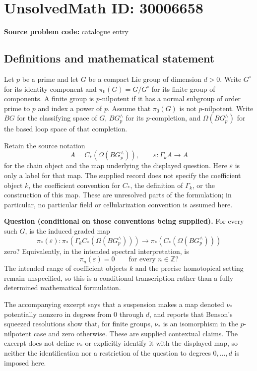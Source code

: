 \documentclass[11pt]{article}
\newcommand{\Z}{\mathbb{Z}}
\begin{document}
\section*{UnsolvedMath ID: 30006658}
\textbf{Source problem code:} catalogue entry
\subsection{Definitions and mathematical statement}
Let \(p\) be a prime and let \(G\) be a compact Lie group of dimension \(d>0\). Write \(G^\circ\) for its identity component and \(\pi_0(G)=G/G^\circ\) for its finite group of components. A finite group is \(p\)-nilpotent if it has a normal subgroup of order prime to \(p\) and index a power of \(p\). Assume that \(\pi_0(G)\) is not \(p\)-nilpotent. Write \(BG\) for the classifying space of \(G\), \(BG^\wedge_p\) for its \(p\)-completion, and \(\Omega(BG^\wedge_p)\) for the based loop space of that completion.

Retain the source notation
\[
A=C_*(\Omega(BG^\wedge_p)),\qquad
\varepsilon\colon\Gamma_k A\longrightarrow A
\]
for the chain object and the map underlying the displayed question. Here \(\varepsilon\) is only a label for that map. The supplied record does not specify the coefficient object \(k\), the coefficient convention for \(C_*\), the definition of \(\Gamma_k\), or the construction of this map. These are unresolved parts of the formulation; in particular, no particular field or cellularization convention is assumed here.

\textbf{Question (conditional on those conventions being supplied).} For every such \(G\), is the induced graded map
\[
\pi_*(\varepsilon)\colon
\pi_*(\Gamma_k C_*(\Omega(BG^\wedge_p)))
\longrightarrow
\pi_*(C_*(\Omega(BG^\wedge_p)))
\]
zero? Equivalently, in the intended spectral interpretation, is
\[
\pi_n(\varepsilon)=0\qquad\text{for every }n\in\Z?
\]
The intended range of coefficient objects \(k\) and the precise homotopical setting remain unspecified, so this is a conditional transcription rather than a fully determined mathematical formulation.

The accompanying excerpt says that a suspension makes a map denoted \(\nu_*\) potentially nonzero in degrees from \(0\) through \(d\), and reports that Benson's squeezed resolutions show that, for finite groups, \(\nu_*\) is an isomorphism in the \(p\)-nilpotent case and zero otherwise. These are supplied contextual claims. The excerpt does not define \(\nu_*\) or explicitly identify it with the displayed map, so neither the identification nor a restriction of the question to degrees \(0,\ldots,d\) is imposed here.
\end{document}

